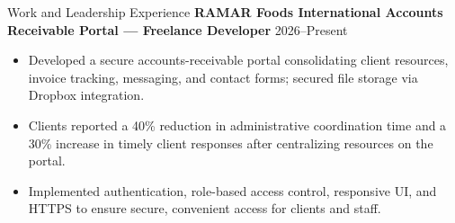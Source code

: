 \documentclass{resume}
\begin{document}
\begin{rSection}{Work and Leadership Experience}
\textbf{RAMAR Foods International Accounts Receivable Portal — Freelance Developer} \hfill 2026–Present
\begin{itemize}
  \item Developed a secure accounts-receivable portal consolidating client resources, invoice tracking, messaging, and contact forms; secured file storage via Dropbox integration.
  \item Clients reported a 40\% reduction in administrative coordination time and a 30\% increase in timely client responses after centralizing resources on the portal.
  \item Implemented authentication, role-based access control, responsive UI, and HTTPS to ensure secure, convenient access for clients and staff.
\end{itemize}

\end{rSection}

\end{document}
